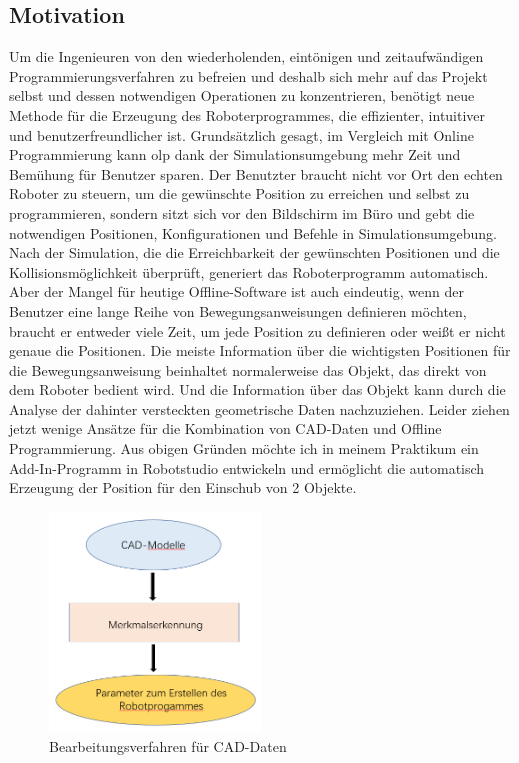 \documentclass[14pt,a4paper,titlepage]{article}
\begin{document}
	\subsection{Motivation}
		Um die Ingenieuren von den wiederholenden, eintönigen und zeitaufwändigen Programmierungsverfahren zu befreien und deshalb sich mehr auf das Projekt selbst und dessen notwendigen Operationen zu konzentrieren, benötigt neue Methode für die Erzeugung des Roboterprogrammes, die effizienter, intuitiver und benutzerfreundlicher ist. 
		\bigbreak
		Grundsätzlich gesagt, im Vergleich mit Online Programmierung kann \acs{olp} dank der Simulationsumgebung mehr Zeit und Bemühung für Benutzer sparen. Der Benutzter braucht nicht vor Ort den echten Roboter zu steuern, um die gewünschte Position zu erreichen und selbst zu programmieren, sondern sitzt sich vor den Bildschirm im Büro und gebt die notwendigen Positionen, Konfigurationen und Befehle in Simulationsumgebung. Nach der Simulation, die die Erreichbarkeit der gewünschten Positionen und die Kollisionsmöglichkeit überprüft, generiert das Roboterprogramm automatisch. Aber der Mangel für heutige Offline-Software ist auch eindeutig, wenn der Benutzer eine lange Reihe von Bewegungsanweisungen definieren möchten, braucht er entweder viele Zeit, um jede Position zu definieren oder weißt er nicht genaue die Positionen. 
		\bigbreak
		Die meiste Information über die wichtigsten Positionen für die Bewegungsanweisung beinhaltet normalerweise das Objekt, das direkt von dem Roboter bedient wird. Und die Information über das Objekt kann durch die Analyse der dahinter versteckten geometrische Daten nachzuziehen. Leider ziehen jetzt wenige Ansätze für die Kombination von CAD-Daten und Offline Programmierung.
		\bigbreak
		Aus obigen Gründen möchte ich in meinem Praktikum ein Add-In-Programm in Robotstudio entwickeln und ermöglicht die automatisch Erzeugung der Position für den Einschub von 2 Objekte. 
		\begin{figure}[h!]
			\centering
			\includegraphics[width=0.5\textwidth]{Bearbeitungsverfahren.png}
			\caption{Bearbeitungsverfahren für CAD-Daten}
			\label{fig1}
		\end{figure}
\end{document}
